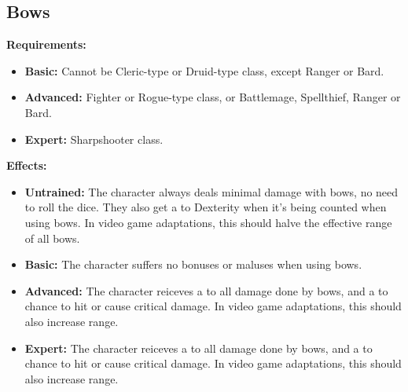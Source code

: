 \documentclass[openany,10pt,a4paper]{book}
\begin{document}
\subsection{Bows}
\begin{table}[!ht]
\centering
{}
\end{table}
\textbf{Requirements:}
\begin{itemize}
	\item \textbf{Basic:} Cannot be Cleric-type or Druid-type class, except Ranger or Bard.
	\item \textbf{Advanced:} Fighter or Rogue-type class, or Battlemage, Spellthief, Ranger or Bard.
	\item \textbf{Expert:} Sharpshooter class.
\end{itemize}
\textbf{Effects:}
\begin{itemize}
	\item \textbf{Untrained:} The character always deals minimal damage with bows, no need to roll the dice. They also get a  to Dexterity when it's being counted when using bows. In video game adaptations, this should halve the effective range of all bows.
	\item \textbf{Basic:} The character suffers no bonuses or maluses when using bows.
	\item \textbf{Advanced:} The character reiceves a  to all damage done by bows, and a  to chance to hit or cause critical damage. In video game adaptations, this should also increase range.
	\item \textbf{Expert:} The character reiceves a  to all damage done by bows, and a  to chance to hit or cause critical damage. In video game adaptations, this should also increase range.
\end{itemize}\newpage
\end{document}
